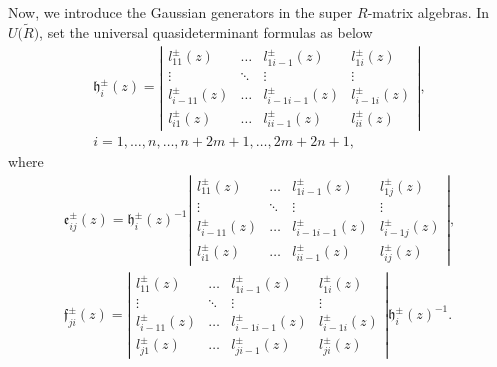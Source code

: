 \documentclass[10pt,a4paper]{amsart}
\numberwithin{equation}{section}
\begin{document}
Now, we introduce the Gaussian generators in the super $R$-matrix algebras. In $U\bigl(\widetilde{R}\bigr)$, set the universal quasideterminant formulas as below
\begin{gather*}
\mathfrak{h}_i^{\pm}(z)=\left|
 \begin{matrix}
 l_{11}^{\pm}(z) & \dots & l_{1i-1}^{\pm}(z) & l_{1i}^{\pm}(z) \\
 \vdots & \ddots & \vdots & \vdots \\
 l_{i-11}^{\pm}(z) & \dots & l_{i-1i-1}^{\pm}(z) & l_{i-1i}^{\pm}(z) \\
 l_{i1}^{\pm}(z) & \dots &l_{ii-1}^{\pm}(z) & \boxed{l_{ii}^{\pm}(z)}
 \end{matrix}\right|, \\
 i=1,\dots,n,\dots,n+2m+1,\dots,2m+2n+1,
\end{gather*}
where
\begin{gather*}\mathfrak{e}_{ij}^{\pm}(z)=\mathfrak{h}_i^{\pm}(z)^{-1}\left|
 \begin{matrix}
 l_{11}^{\pm}(z) & \dots & l_{1i-1}^{\pm}(z) & l_{1j}^{\pm}(z) \\
 \vdots & \ddots & \vdots & \vdots \\
 l_{i-11}^{\pm}(z) & \dots & l_{i-1i-1}^{\pm}(z) & l_{i-1j}^{\pm}(z) \\
 l_{i1}^{\pm}(z) & \dots &l_{ii-1}^{\pm}(z) & \boxed{l_{ij}^{\pm}(z)}
 \end{matrix}\right|,
\\
\mathfrak{f}_{ji}^{\pm}(z)=\left|
 \begin{matrix}
 l_{11}^{\pm}(z) & \dots & l_{1i-1}^{\pm}(z) & l_{1i}^{\pm}(z) \\
 \vdots & \ddots & \vdots & \vdots \\
 l_{i-11}^{\pm}(z) & \dots & l_{i-1i-1}^{\pm}(z) & l_{i-1i}^{\pm}(z) \\
 l_{j1}^{\pm}(z) & \dots &l_{ji-1}^{\pm}(z) & \boxed{l_{ji}^{\pm}(z)}
 \end{matrix}\right|\mathfrak{h}_i^{\pm}(z)^{-1}.
\end{gather*}
\end{document}
